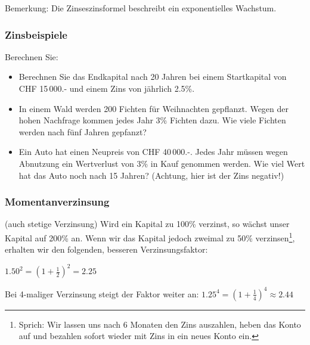 Bemerkung: Die Zinseszinsformel beschreibt ein exponentielles Wachstum.
\newpage

\subsubsection{Zinsbeispiele}

Berechnen Sie:

\begin{itemize}
  \item Berechnen Sie das Endkapital nach 20 Jahren bei einem
  Startkapital von CHF 15\,000.- und einem Zins von jährlich
  2.5\%.\\%

\item In einem Wald werden 200 Fichten für Weihnachten gepflanzt. Wegen der hohen Nachfrage kommen jedes Jahr 3\% Fichten dazu. Wie viele Fichten werden nach fünf Jahren gepfanzt?


\item Ein Auto hat einen Neupreis von CHF 40\,000.-. Jedes Jahr müssen wegen Abnutzung ein Wertverlust von 3\% in Kauf
  genommen werden. Wie viel Wert hat das Auto noch nach 15 Jahren? (Achtung, hier ist der Zins negativ!)

\end{itemize}
\newpage

\subsubsection{Momentanverzinsung}
(auch stetige Verzinsung)
Wird ein Kapital zu 100\% verzinst, so wächst unser Kapital auf 200\%
an. Wenn wir das Kapital jedoch zweimal zu 50\%
verzinsen\footnote{Sprich: Wir lassen uns nach 6 Monaten den Zins
auszahlen, heben das Konto auf und bezahlen sofort wieder mit Zins in
ein neues Konto ein.}, erhalten wir den folgenden, besseren Verzinsungsfaktor:

$1.50^2  = (1 + \frac12)^2 = 2.25$

Bei 4-maliger Verzinsung steigt der Faktor weiter an:
$1.25^4 = (1 + \frac14)^4 \approx 2.44 $

